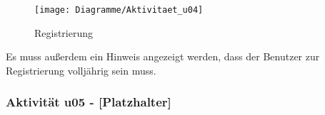 \documentclass[a4paper,12pt,oneside]{scrartcl}
\begin{document}
\begin{figure}[!htbp]
\centering
\noindent\texttt{[image: Diagramme/Aktivitaet\_u04]}
\caption{Registrierung}
\end{figure}
\FloatBarrier
Es muss außerdem ein Hinweis angezeigt werden, dass der Benutzer zur Registrierung volljährig sein muss.


\subsubsection{Aktivität u05 - [Platzhalter]}


%

\end{document}
